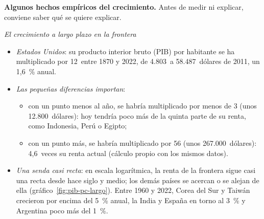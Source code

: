 \documentclass[11pt]{article}
\begin{document}
\begin{anotaciones}
\textbf{Algunos hechos empíricos del crecimiento.} Antes de medir ni explicar, conviene saber qué se quiere explicar.

\smallskip
\emph{El crecimiento a largo plazo en la frontera}
\begin{itemize}
\item \emph{Estados Unidos}: su producto interior bruto (PIB) por habitante se ha multiplicado por 12~entre 1870 y 2022, de 4.803~a 58.487~dólares de 2011, un 1,6~\% anual\nocite{BoltvanZanden2025}.
\item \emph{Las pequeñas diferencias importan}:
  \begin{itemize}
  \item con un punto menos al año, se habría multiplicado por menos de 3 (unos 12.800~dólares): hoy tendría poco más de la quinta parte de su renta, como Indonesia, Perú o Egipto;
  \item con un punto más, se habría multiplicado por 56 (unos 267.000~dólares): 4,6~veces su renta actual (cálculo propio con los mismos datos).
  \end{itemize}
\item \emph{Una senda casi recta}: en escala logarítmica, la renta de la frontera sigue casi una recta desde hace siglo y medio; los demás países se acercan o se alejan de ella (gráfico~\ref{fig:pib-pc-largo}). Entre 1960 y 2022, Corea del Sur y Taiwán crecieron por encima del 5~\% anual, la India y España en torno al 3~\% y Argentina poco más del 1~\%\nocite{BoltvanZanden2025}.
\end{itemize}

\begin{figuracaja}
\caption{PIB por habitante de 1870 a 2022 en Estados Unidos, Reino Unido, Japón, España, Corea del Sur y la India (escala logarítmica)}\label{fig:pib-pc-largo}
\end{figuracaja}


\end{anotaciones}
\end{document}
